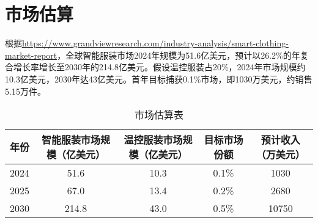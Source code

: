 \documentclass[UTF8]{report}
\theoremstyle{MyLineTheoremStyle} %
\theoremstyle{MyBlockTheoremStyle} %
\theoremstyle{MySubsubsectionStyle} %
\begin{document}
\section{市场估算}
根据\url{https://www.grandviewresearch.com/industry-analysis/smart-clothing-market-report}，全球智能服装市场2024年规模为51.6亿美元，预计以26.2\%的年复合增长率增长至2030年的214.8亿美元。假设温控服装占20\%，2024年市场规模约10.3亿美元，2030年达43亿美元。首年目标捕获0.1\%市场，即1030万美元，约销售5.15万件。

\begin{table}[h]
    \centering
    \begin{tabular}{|c|c|c|c|c|}
        \hline
        \textbf{年份} & \textbf{智能服装市场规模（亿美元）} & \textbf{温控服装市场规模（亿美元）} & \textbf{目标市场份额} & \textbf{预计收入（万美元）} \\
        \hline
        2024 & 51.6 & 10.3 & 0.1\% & 1030 \\
        \hline
        2025 & 67.0 & 13.4 & 0.2\% & 2680 \\
        \hline
        2030 & 214.8 & 43.0 & 0.5\% & 10750 \\
        \hline
    \end{tabular}
    \caption{市场估算表}
\end{table}
\end{document}
